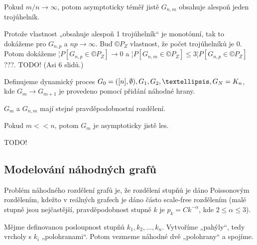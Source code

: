 \documentclass[12pt]{article}					%
\begin{document}
    \begin{veta}
        Pokud $m/n \rightarrow ∞$, potom asymptoticky téměř jistě $G_{n, m}$ obsahuje alespoň jeden trojúhelník.

        \begin{dukazin}


            Protože vlastnost „obsahuje alespoň 1 trojúhelník“ je monotónní, tak to dokážeme pro $G_{n, p}$ a $np \rightarrow ∞$. Buď $©P_Z$ vlastnost, že počet trojúhelníků je 0. Potom dokážeme $¦P[G_{n, p} \in ©P_Z] \rightarrow 0$ a $¦P[G_{n, m} \in ©P_Z] ≤ 3 ¦P[G_{n, p} \in ©P_Z]$ ???. TODO! (Asi 6 slidů.)
        \end{dukazin}
    \end{veta}

    \begin{definice}
        Definujeme dynamický proces $G_0 = ([n], \O), G_1, G_2, …, G_N = K_n$, kde $G_m \rightarrow G_{m + 1}$ je provedeno pomocí přidání náhodné hrany.
    \end{definice}

    \begin{pozorovani}
        $G_m$ a $G_{n, m}$ mají stejné pravděpodobnostní rozdělení.
    \end{pozorovani}

    \begin{veta}
        Pokud $m << n$, potom $G_m$ je asymptoticky jistě les.

        \begin{dukazin}
            TODO!
        \end{dukazin}
    \end{veta}

    \subsection{Modelování náhodných grafů}
        \begin{poznamka}
            Problém náhodného rozdělení grafů je, že rozdělení stupňů je dáno Poissonovým rozdělením, kdežto v reálných grafech je dáno částo scale-free rozdělením (malé stupně jsou nejčastější, pravděpodobnost stupně $k$ je $p_k = Ck^{-\alpha}$, kde $2 ≤ \alpha ≤ 3$).
        \end{poznamka}

        \begin{definice}
            Mějme definovanou posloupnost stupňů $k_1, k_2, …, k_n$. Vytvoříme „pahýly“, tedy vrcholy s $k_i$ „polohranami“. Potom vezmeme náhodné dvě „polohrany“ a spojíme.
        \end{definice}
\end{document}
